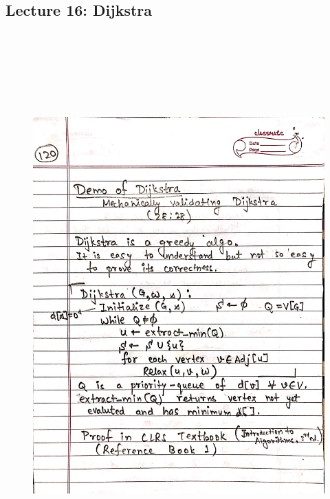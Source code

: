 \newpage
{\color{black} \subsection*{Lecture 16: Dijkstra}}
\begin{figure}[H]
    \centering
    \includegraphics[width=16cm, height=21cm]{"./MIT-6.006/MIT-6006-120"}
\end{figure}


